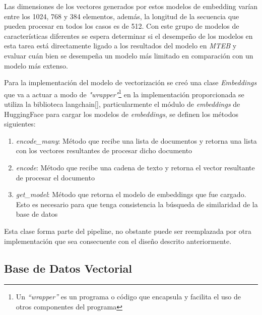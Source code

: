         Las dimensiones de los vectores generados por estos modelos de embedding varían entre los 1024, 768 y 384 elementos, además, la longitud de la secuencia que pueden procesar en todos los casos es de 512. Con este grupo de modelos de características diferentes se espera determinar si el desempeño de los modelos en esta tarea está directamente ligado a los resultados del modelo en \emph{MTEB} y evaluar cuán bien se desempeña un modelo más limitado en comparación con un modelo más extenso.

    Para la implementación del modelo de vectorización se creó una clase \emph{Embeddings} que va a actuar a modo de \emph{"wrapper"}\footnote{Un \emph{“wrapper”} es un programa o código que encapsula y facilita el uso de otros componentes del programa} en la implementación proporcionada se utiliza la biblioteca langchain[\cite{langchain}], particularmente el módulo de \emph{embeddings} de HuggingFace para cargar los modelos de \emph{embeddings}, se definen los métodos siguientes:
    \begin{enumerate}
        \item \emph{encode\_many}: Método que recibe una lista de documentos y retorna una lista con los vectores resultantes de procesar dicho documento
        \item \emph{encode}: Método que recibe una cadena de texto y retorna el vector resultante de procesar el documento 
        \item \emph{get\_model}: Método que retorna el modelo de embeddings que fue cargado. Esto es necesario para que tenga consistencia la búsqueda de similaridad de la base de datos
    \end{enumerate}

    Esta clase forma parte del pipeline, no obstante puede ser reemplazada por otra implementación que sea consecuente con el diseño descrito anteriormente.

    \subsection{Base de Datos Vectorial}
